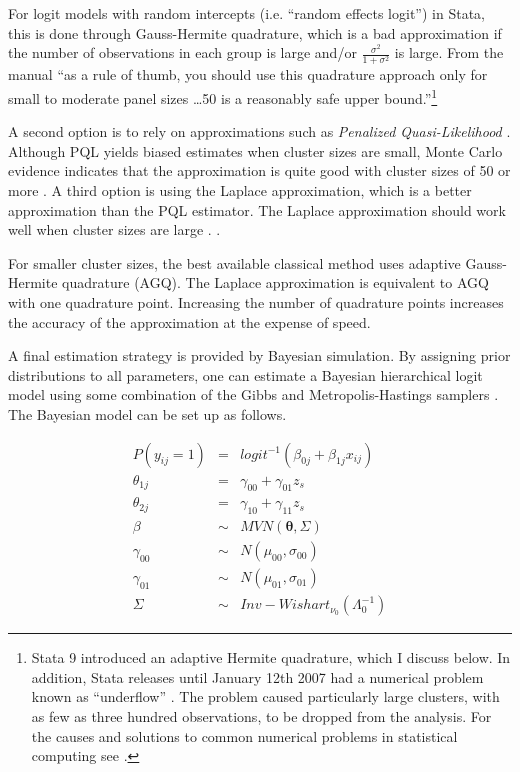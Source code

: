 For logit models with random intercepts (i.e. ``random effects logit'') in Stata, this is done through Gauss-Hermite quadrature, which is a bad approximation if the number of observations in each group is large and/or $\frac{\sigma^2}{1+\sigma^2}$ is large. From the manual \citep[p.139]{statacorp:2003} ``as a rule of thumb, you should use this quadrature approach only for small to moderate panel sizes \dots 50 is a reasonably safe upper bound.''\footnote{Stata 9 introduced an adaptive Hermite quadrature, which I discuss below. In addition, Stata releases until January 12th 2007 had a numerical problem known as ``underflow'' \cite{stata:2007}. The problem caused particularly large clusters, with as few as three hundred observations, to be dropped from the analysis. For the causes and solutions to common numerical problems in statistical computing see \citet{altman:2003}.}

A second option is to rely on approximations such as \textit{Penalized Quasi-Likelihood} \citep{breslow:1993}.  Although PQL yields biased estimates when cluster sizes are small, Monte Carlo evidence indicates that the approximation is quite good with cluster sizes of 50 or more \citep{Breslow:2003}. A third option is using the  Laplace approximation, which is a better approximation than the PQL estimator. The Laplace approximation should work well when cluster sizes are large . \citep[p.269]{molenberghs:2005}.

For smaller cluster sizes, the best available classical method uses adaptive Gauss-Hermite quadrature (AGQ). The Laplace approximation is equivalent to AGQ with one quadrature point. Increasing the number of quadrature points increases the accuracy of the approximation at the expense of speed.

A final estimation strategy is provided by Bayesian simulation. By assigning prior distributions to all parameters, one can estimate a Bayesian hierarchical logit model using some combination of the Gibbs and Metropolis-Hastings samplers \citep{gelman:2004}. The Bayesian model can be set up as follows.

\begin{eqnarray}
P(y_{ij}=1)&=& logit^{-1}(\beta_{0j} + \beta_{1j} x_{ij})
\label{eq:lmvnb}\\
\theta_{1j}&=& \gamma_{00}+\gamma_{01} z_s \\
\theta_{2j}&=& \gamma_{10}+\gamma_{11} z_s \\
\beta &\sim& MVN(\mathbf{\theta},\Sigma) \\
\gamma_{00} &\sim& N(\mu_{00},\sigma_{00}) \\
\gamma_{01} &\sim& N(\mu_{01},\sigma_{01}) \\
\Sigma &\sim& Inv-Wishart_{\nu_0}(\Lambda_0^{-1})\label{eq:lmvne}
\end{eqnarray}

